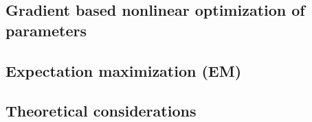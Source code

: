 \subsection{Gradient based nonlinear optimization of parameters}\label{sec:grad}%


\subsection{Expectation maximization (EM)}%


\subsection{Theoretical considerations}%



